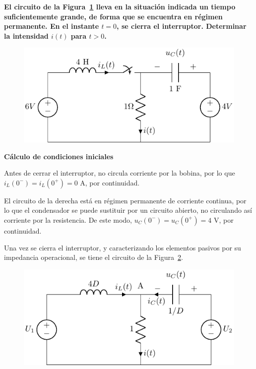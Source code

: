 \documentclass[11pt]{book} %
\begin{document}
	\begin{example}\label{ex.2o_orden}
	    \textbf{El circuito de la Figura~\ref{fig.ejemplo_2orden} lleva en la situación indicada un tiempo suficientemente grande, de forma que se encuentra en régimen permanente. En el instante $t=0$, se cierra el interruptor. Determinar la intensidad $i(t)$ para $t>0$. }
	    \begin{figure}[H]
	        \centering
	        \includegraphics{../figs/ejemplo_2orden.pdf}
	        \label{fig.ejemplo_2orden}
	    \end{figure}
	        
	    \textbf{Cálculo de condiciones iniciales}
	        
	    Antes de cerrar el interruptor, no circula corriente por la bobina, por lo que $i_L(0^-)=i_L(0^+)=0$ A, por continuidad. 
	    
	    El circuito de la derecha está en régimen permanente de corriente continua, por lo que el condensador se puede sustituir por un circuito abierto, no circulando así corriente por la resistencia. De este modo, $u_C(0^-)=u_C(0^+)=4$ V, por continuidad.
	    
	    
	    
	    Una vez se cierra el interruptor, y caracterizando los elementos pasivos por su impedancia operacional, se tiene el circuito de la Figura~\ref{fig.ejemplo_2orden1}. 
	    \begin{figure}[H]
	        \centering
	        \includegraphics[]{../figs/ejemplo_2orden1.pdf}
	        \label{fig.ejemplo_2orden1}
	    \end{figure}
	    

\end{example}
\end{document}
